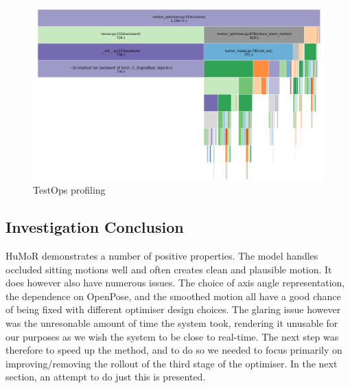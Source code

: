 \begin{figure}[!ht]
    \centering
    \includegraphics[width=1\textwidth]{Figures/humor/profiling/profiling.png}
    \caption{TestOps profiling}
    \label{fig:humor_profiling}
\end{figure}

\subsection{Investigation Conclusion}
HuMoR demonstrates a number of positive properties. The model handles occluded sitting motions well and often creates clean and plausible motion. It does however also have numerous issues. The choice of axis angle representation, the dependence on OpenPose, and the smoothed motion all have a good chance of being fixed with different optimiser design choices.  The glaring issue however was the unresonable amount of time the system took, rendering it unusable for our purposes as we wish the system to be close to real-time. The next step was therefore to speed up the method, and to do so we needed to focus primarily on improving/removing the rollout of the third stage of the optimiser. In the next section, an attempt to do just this is presented.